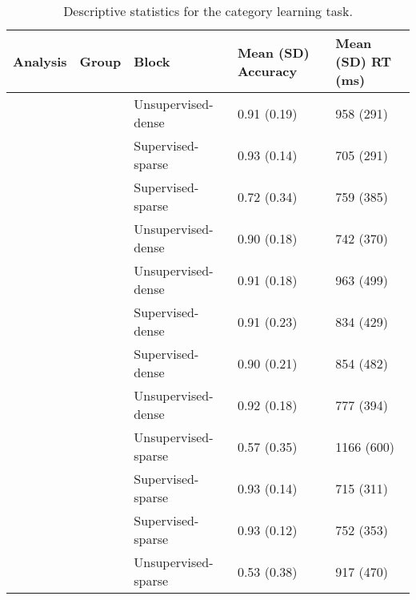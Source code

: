 \documentclass[../dissertation.tex]{subfiles}
\begin{document}
\begin{table}[H]
\caption{Descriptive statistics for the category learning task.}
\vspace{-10pt}
\begin{center}
\begin{tabularx}{\textwidth}{>{\centering\arraybackslash}p{1.5cm}>{\centering\arraybackslash}p{1.5cm}YYY}
\toprule
Analysis       & Group              & Block               & Mean (SD) Accuracy & Mean (SD) RT (ms) \\ \midrule
{} &  & Unsupervised-dense  & 0.91 (0.19)        & 958 (291)        \\  
                   &                    & Supervised-sparse   & 0.93 (0.14)        & 705 (291)         \\  
                   &  & Supervised-sparse   & 0.72 (0.34)        & 759 (385)         \\  
                   &                    & Unsupervised-dense  & 0.90 (0.18)        & 742 (370)         \\ \midrule
{} &  & Unsupervised-dense  & 0.91 (0.18)        & 963 (499)        \\  
                   &                    & Supervised-dense    & 0.91 (0.23)        & 834 (429)         \\  
                   &  & Supervised-dense    & 0.90 (0.21)        & 854 (482)         \\  
                   &                    & Unsupervised-dense  & 0.92 (0.18)        & 777 (394)         \\ \midrule
{} &  & Unsupervised-sparse & 0.57 (0.35)        & 1166 (600)        \\ 
                   &                    & Supervised-sparse   & 0.93 (0.14)        & 715 (311)         \\  
                   &  & Supervised-sparse   & 0.93 (0.12)        & 752 (353)         \\ 
                   &                    & Unsupervised-sparse & 0.53 (0.38)        & 917 (470)        \\
 \bottomrule                    
\end{tabularx}
\label{exp1expdesc}
\end{center}
\end{table}
\end{document}
